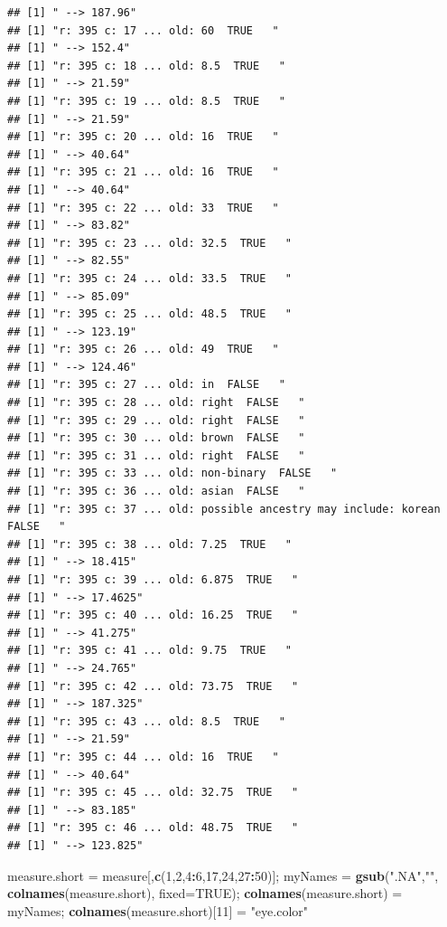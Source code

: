 \documentclass[]{article}
\newenvironment{Shaded}{\begin{snugshade}}{\end{snugshade}}
\newcommand{\DataTypeTok}[1]{\textcolor[rgb]{0.13,0.29,0.53}{#1}}
\newcommand{\DecValTok}[1]{\textcolor[rgb]{0.00,0.00,0.81}{#1}}
\newcommand{\KeywordTok}[1]{\textcolor[rgb]{0.13,0.29,0.53}{\textbf{#1}}}
\newcommand{\NormalTok}[1]{#1}
\newcommand{\OperatorTok}[1]{\textcolor[rgb]{0.81,0.36,0.00}{\textbf{#1}}}
\newcommand{\OtherTok}[1]{\textcolor[rgb]{0.56,0.35,0.01}{#1}}
\newcommand{\StringTok}[1]{\textcolor[rgb]{0.31,0.60,0.02}{#1}}
\begin{document}
\begin{verbatim}
## [1] " --> 187.96"
## [1] "r: 395 c: 17 ... old: 60  TRUE   "
## [1] " --> 152.4"
## [1] "r: 395 c: 18 ... old: 8.5  TRUE   "
## [1] " --> 21.59"
## [1] "r: 395 c: 19 ... old: 8.5  TRUE   "
## [1] " --> 21.59"
## [1] "r: 395 c: 20 ... old: 16  TRUE   "
## [1] " --> 40.64"
## [1] "r: 395 c: 21 ... old: 16  TRUE   "
## [1] " --> 40.64"
## [1] "r: 395 c: 22 ... old: 33  TRUE   "
## [1] " --> 83.82"
## [1] "r: 395 c: 23 ... old: 32.5  TRUE   "
## [1] " --> 82.55"
## [1] "r: 395 c: 24 ... old: 33.5  TRUE   "
## [1] " --> 85.09"
## [1] "r: 395 c: 25 ... old: 48.5  TRUE   "
## [1] " --> 123.19"
## [1] "r: 395 c: 26 ... old: 49  TRUE   "
## [1] " --> 124.46"
## [1] "r: 395 c: 27 ... old: in  FALSE   "
## [1] "r: 395 c: 28 ... old: right  FALSE   "
## [1] "r: 395 c: 29 ... old: right  FALSE   "
## [1] "r: 395 c: 30 ... old: brown  FALSE   "
## [1] "r: 395 c: 31 ... old: right  FALSE   "
## [1] "r: 395 c: 33 ... old: non-binary  FALSE   "
## [1] "r: 395 c: 36 ... old: asian  FALSE   "
## [1] "r: 395 c: 37 ... old: possible ancestry may include: korean  FALSE   "
## [1] "r: 395 c: 38 ... old: 7.25  TRUE   "
## [1] " --> 18.415"
## [1] "r: 395 c: 39 ... old: 6.875  TRUE   "
## [1] " --> 17.4625"
## [1] "r: 395 c: 40 ... old: 16.25  TRUE   "
## [1] " --> 41.275"
## [1] "r: 395 c: 41 ... old: 9.75  TRUE   "
## [1] " --> 24.765"
## [1] "r: 395 c: 42 ... old: 73.75  TRUE   "
## [1] " --> 187.325"
## [1] "r: 395 c: 43 ... old: 8.5  TRUE   "
## [1] " --> 21.59"
## [1] "r: 395 c: 44 ... old: 16  TRUE   "
## [1] " --> 40.64"
## [1] "r: 395 c: 45 ... old: 32.75  TRUE   "
## [1] " --> 83.185"
## [1] "r: 395 c: 46 ... old: 48.75  TRUE   "
## [1] " --> 123.825"
\end{verbatim}

\begin{Shaded}
\begin{Highlighting}[]
\NormalTok{measure.short =}\StringTok{ }\NormalTok{measure[,}\KeywordTok{c}\NormalTok{(}\DecValTok{1}\NormalTok{,}\DecValTok{2}\NormalTok{,}\DecValTok{4}\OperatorTok{:}\DecValTok{6}\NormalTok{,}\DecValTok{17}\NormalTok{,}\DecValTok{24}\NormalTok{,}\DecValTok{27}\OperatorTok{:}\DecValTok{50}\NormalTok{)];}
\NormalTok{myNames =}\StringTok{ }\KeywordTok{gsub}\NormalTok{(}\StringTok{".NA"}\NormalTok{,}\StringTok{""}\NormalTok{, }\KeywordTok{colnames}\NormalTok{(measure.short), }\DataTypeTok{fixed=}\OtherTok{TRUE}\NormalTok{);}
\KeywordTok{colnames}\NormalTok{(measure.short) =}\StringTok{ }\NormalTok{myNames;}
\KeywordTok{colnames}\NormalTok{(measure.short)[}\DecValTok{11}\NormalTok{] =}\StringTok{ "eye.color"}
\end{Highlighting}
\end{Shaded}
\end{document}
